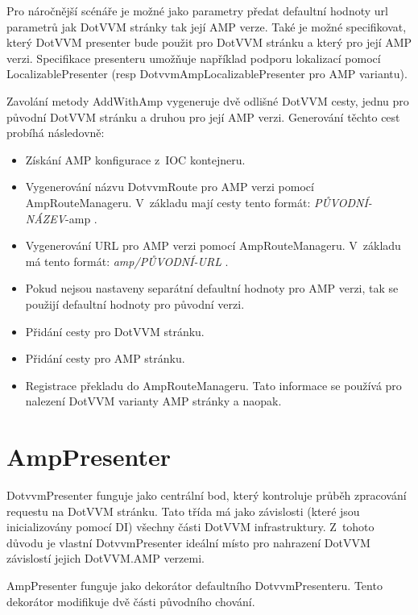 Pro náročnější scénáře je možné jako parametry předat defaultní hodnoty url parametrů jak DotVVM stránky tak její AMP verze. Také je možné specifikovat, který DotVVM presenter bude použit pro DotVVM stránku a který pro její AMP verzi. Specifikace presenteru umožňuje například podporu lokalizací pomocí LocalizablePresenter (resp DotvvmAmpLocalizablePresenter pro AMP variantu).

Zavolání metody AddWithAmp vygeneruje dvě odlišné DotVVM cesty, jednu pro původní DotVVM stránku a druhou pro její AMP verzi.\newline
Generování těchto cest probíhá následovně:
\begin{itemize}
    \item Získání AMP konfigurace z~IOC kontejneru.
    \item Vygenerování názvu  DotvvmRoute pro AMP verzi pomocí AmpRouteManageru.\newline
    V~základu mají cesty tento formát: \textit{PŮVODNÍ-NÁZEV}-amp .
    \item Vygenerování URL  pro AMP verzi pomocí AmpRouteManageru.\newline
    V~základu má tento formát: \textit{amp/PŮVODNÍ-URL} .
    \item Pokud nejsou nastaveny separátní defaultní hodnoty pro AMP verzi, tak se použijí defaultní hodnoty pro původní verzi.
    \item Přidání cesty pro DotVVM stránku.
    \item Přidání cesty pro AMP stránku.
    \item Registrace překladu do AmpRouteManageru.\newline
    Tato informace se používá pro nalezení DotVVM varianty AMP stránky a naopak.
\end{itemize}

\section{AmpPresenter}
DotvvmPresenter funguje jako centrální bod, který kontroluje průběh zpracování requestu na DotVVM stránku. Tato třída má jako závislosti (které jsou inicializovány pomocí DI) všechny části DotVVM infrastruktury. Z~tohoto důvodu je vlastní DotvvmPresenter ideální místo pro nahrazení DotVVM závislostí jejich DotVVM.AMP verzemi.

AmpPresenter funguje jako dekorátor defaultního DotvvmPresenteru. Tento dekorátor modifikuje dvě části původního chování.

